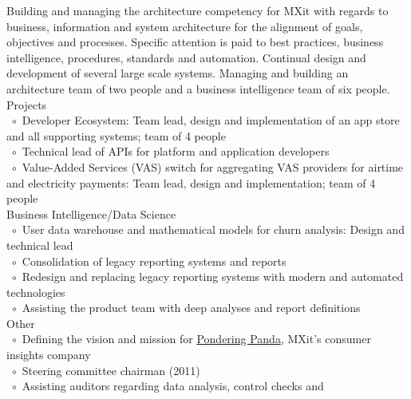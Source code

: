 \documentclass[10pt,a4paper,final]{columncv}
\newcommand{\cvitembullet}{~$\circ$~}
\newcommand{\cvitempbullet}{\phantom{\cvitembullet}}
\begin{document}
\begin{cvenv}
  \cvitem{}{} %
  
         {Building and managing the architecture competency for MXit with regards to 
         business, information and system architecture for the alignment of goals, 
         objectives and processes. Specific attention is paid to best practices, business 
         intelligence, procedures, standards and automation. Continual design and 
         development of several large scale systems. Managing and building an architecture
         team of two people and a business intelligence team of six people.}
        {Projects \\
         \cvitembullet Developer Ecosystem: Team lead, design and implementation 
         \cvitempbullet of an app store and all supporting systems; team of 4 people \\
         \cvitembullet Technical lead of APIs for platform and application developers \\
         \cvitembullet Value-Added Services (VAS) switch for aggregating VAS providers 
         \cvitempbullet for airtime and electricity payments: Team lead, design and 
         \cvitempbullet implementation; team of 4 people \\
         Business Intelligence/Data Science \\
         \cvitembullet User data warehouse and mathematical models for churn analysis: 
         \cvitempbullet Design and technical lead \\
         \cvitembullet Consolidation of legacy reporting systems and reports \\
         \cvitembullet Redesign and replacing legacy reporting systems with modern and 
         \cvitempbullet automated technologies \\
         \cvitembullet Assisting the product team with deep analyses and report 
         \cvitempbullet definitions \\
         Other \\
         \cvitembullet Defining the vision and mission for \href{http://www.ponderingpanda.com/}{Pondering Panda}, MXit's
         \cvitempbullet consumer insights company \\
         \cvitembullet Steering committee chairman (2011) \\
         \cvitembullet Assisting auditors regarding data analysis, control checks and 
}
\end{cvenv}
\end{document}

